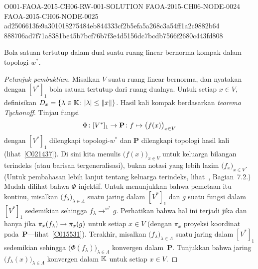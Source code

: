 \begin{o001readerwork}
  {O001-FAOA-2015-CH06-RW-001-SOLUTION}
  {FAOA-2015-CH06-NODE-0024}
  {FAOA-2015-CH06-NODE-0025}
  {ad2506613fe9a301018275484eb844333cf2b5efa5a268c3a54ff1a2c9882b64}
  {888706ad7f71a8381be45b7bcf76b7f3e4d5156dc7bcdb7566f2680c443fd808}
\begin{o001result}
\begin{thm}\label{C067441} Bola satuan tertutup dalam dual suatu ruang linear bernorma
kompak dalam topologi-$w^*$.
\end{thm}
\end{o001result}
\begin{o001sourcehint}
\begin{proof}[\emph{Petunjuk pembuktian}] Misalkan $V$ suatu ruang linear bernorma, dan nyatakan dengan $[V^*]_1$ bola satuan tertutup dari
ruang dualnya.  Untuk setiap $x \in V$, definisikan $D_x = \{\lambda \in \mathbb{K} \colon \lvert\lambda\rvert \le \lVert x\rVert\}$.  Hasil kali
 kompak berdasarkan \emph{teorema Tychonoff}.  Tinjau fungsi
   \[ \Phi\colon [V^*]_1 \rightarrow \mathbf P \colon f \mapsto \bigl(f(x)\bigr)_{x \in V} \]
dengan $[V^*]_1$ dilengkapi topologi-$w^*$ dan $\mathbf P$ dilengkapi topologi hasil kali (lihat~\ref{C021437}).  Di sini kita menulis
$\bigl(f(x)\bigr)_{x \in V}$ untuk keluarga bilangan terindeks (atau barisan tergeneralisasi), bukan notasi yang lebih lazim
$\bigl(f_x\bigr)_{x \in V}$.  (Untuk pembahasan lebih lanjut tentang keluarga terindeks, lihat~\cite{Erdman:2007}, Bagian~7.2.)  Mudah dilihat bahwa
$\Phi$ injektif.  Untuk menunjukkan bahwa pemetaan itu kontinu, misalkan $\bigl(f_\lambda\bigr)_{\lambda \in \Lambda}$ suatu jaring dalam $[V^*]_1$
dan $g$ suatu fungsi dalam $[V^*]_1$ sedemikian sehingga $f_\lambda \to^{w^*} g$.  Perhatikan bahwa hal ini terjadi jika dan hanya jika
$\pi_x(f_\lambda) \rightarrow \pi_x(g)$ untuk setiap $x \in V$ (dengan $\pi_x$ proyeksi koordinat pada~$\mathbf P$---lihat~\ref{C015531}).
Terakhir, misalkan $\bigl(f_\lambda\bigr)_{\lambda \in \Lambda}$ suatu jaring dalam $[V^*]_1$ sedemikian sehingga $\bigl(\Phi(f_\lambda)\bigr)_{\lambda \in \Lambda}$
konvergen dalam~$\mathbf P$.  Tunjukkan bahwa jaring $\bigl(f_\lambda(x)\bigr)_{\lambda \in \Lambda}$ konvergen dalam $\mathbb{K}$ untuk setiap $x \in V$.

\end{proof}
\end{o001sourcehint}
\end{o001readerwork}
